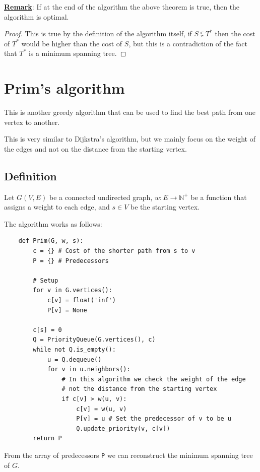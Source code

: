 \documentclass[12pt]{extarticle}
\newcommand{\N}{\mathbb{N}}
\begin{document}
\textbf{\underline{Remark}}: If at the end of the algorithm the above theorem is true, then the algorithm is optimal.

\begin{proof}
    This is true by the definition of the algorithm itself, if $S \subsetneqq T^*$ then the cost of $T^*$ would be higher than the cost of $S$, but this is a contradiction of the fact that $T^*$ is a minimum spanning tree.
\end{proof}

\section{Prim's algorithm}

This is another greedy algorithm that can be used to find the best path from one vertex to another.

This is very similar to Dijkstra's algorithm, but we mainly focus on the weight of the edges and not on the distance from the starting vertex.

\subsection{Definition}

Let $G(V, E)$ be a connected undirected graph, $w: E \to \N^+$ be a function that assigns a weight to each edge, and $s \in V$ be the starting vertex.

The algorithm works as follows:

\begin{verbatim}
    def Prim(G, w, s):
        c = {} # Cost of the shorter path from s to v
        P = {} # Predecessors

        # Setup
        for v in G.vertices():
            c[v] = float('inf')
            P[v] = None
        
        c[s] = 0
        Q = PriorityQueue(G.vertices(), c)
        while not Q.is_empty():
            u = Q.dequeue()
            for v in u.neighbors():
                # In this algorithm we check the weight of the edge
                # not the distance from the starting vertex
                if c[v] > w(u, v):
                    c[v] = w(u, v)
                    P[v] = u # Set the predecessor of v to be u
                    Q.update_priority(v, c[v])
        return P
\end{verbatim}

From the array of predecessors \texttt{P} we can reconstruct the minimum spanning tree of $G$.
\end{document}
